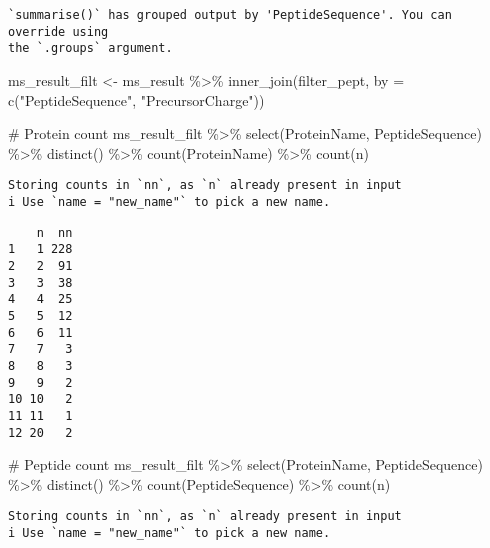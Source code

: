 \documentclass[
  letterpaper,
  DIV=11,
  numbers=noendperiod]{scrartcl}
\newenvironment{Shaded}{\begin{snugshade}}{\end{snugshade}}
\newcommand{\AttributeTok}[1]{\textcolor[rgb]{0.40,0.45,0.13}{#1}}
\newcommand{\CommentTok}[1]{\textcolor[rgb]{0.37,0.37,0.37}{#1}}
\newcommand{\FunctionTok}[1]{\textcolor[rgb]{0.28,0.35,0.67}{#1}}
\newcommand{\NormalTok}[1]{\textcolor[rgb]{0.00,0.23,0.31}{#1}}
\newcommand{\OtherTok}[1]{\textcolor[rgb]{0.00,0.23,0.31}{#1}}
\newcommand{\SpecialCharTok}[1]{\textcolor[rgb]{0.37,0.37,0.37}{#1}}
\newcommand{\StringTok}[1]{\textcolor[rgb]{0.13,0.47,0.30}{#1}}
\begin{document}
\begin{verbatim}
`summarise()` has grouped output by 'PeptideSequence'. You can override using
the `.groups` argument.
\end{verbatim}

\begin{Shaded}
\begin{Highlighting}[]
\NormalTok{ms\_result\_filt }\OtherTok{\textless{}{-}}\NormalTok{ ms\_result }\SpecialCharTok{\%\textgreater{}\%}
  \FunctionTok{inner\_join}\NormalTok{(filter\_pept, }\AttributeTok{by =} \FunctionTok{c}\NormalTok{(}\StringTok{"PeptideSequence"}\NormalTok{, }\StringTok{"PrecursorCharge"}\NormalTok{)) }

\CommentTok{\# Protein count}
\NormalTok{ms\_result\_filt }\SpecialCharTok{\%\textgreater{}\%} 
  \FunctionTok{select}\NormalTok{(ProteinName, PeptideSequence) }\SpecialCharTok{\%\textgreater{}\%}
  \FunctionTok{distinct}\NormalTok{() }\SpecialCharTok{\%\textgreater{}\%}
  \FunctionTok{count}\NormalTok{(ProteinName) }\SpecialCharTok{\%\textgreater{}\%} 
  \FunctionTok{count}\NormalTok{(n)}
\end{Highlighting}
\end{Shaded}

\begin{verbatim}
Storing counts in `nn`, as `n` already present in input
i Use `name = "new_name"` to pick a new name.
\end{verbatim}

\begin{verbatim}
    n  nn
1   1 228
2   2  91
3   3  38
4   4  25
5   5  12
6   6  11
7   7   3
8   8   3
9   9   2
10 10   2
11 11   1
12 20   2
\end{verbatim}

\begin{Shaded}
\begin{Highlighting}[]
\CommentTok{\# Peptide count}
\NormalTok{ms\_result\_filt }\SpecialCharTok{\%\textgreater{}\%} 
  \FunctionTok{select}\NormalTok{(ProteinName, PeptideSequence) }\SpecialCharTok{\%\textgreater{}\%}
  \FunctionTok{distinct}\NormalTok{() }\SpecialCharTok{\%\textgreater{}\%}
  \FunctionTok{count}\NormalTok{(PeptideSequence) }\SpecialCharTok{\%\textgreater{}\%} 
  \FunctionTok{count}\NormalTok{(n)}
\end{Highlighting}
\end{Shaded}

\begin{verbatim}
Storing counts in `nn`, as `n` already present in input
i Use `name = "new_name"` to pick a new name.
\end{verbatim}
\end{document}

